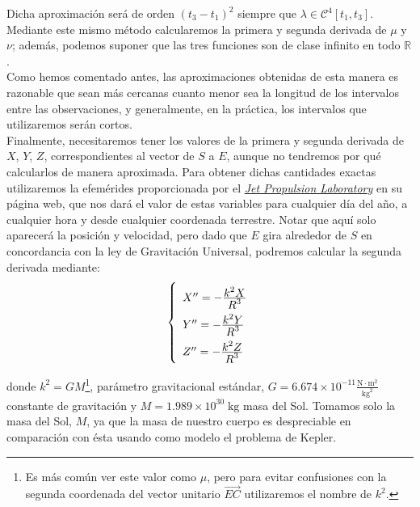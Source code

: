 \documentclass[11pt]{book}
\newcommand\ddfrac[2]{\frac{\displaystyle #1}{\displaystyle #2}}
\begin{document}
Dicha aproximación será de orden $(t_3-t_1)^2$ siempre que $\lambda\in\mathcal{C}^4[t_1,t_3]$. Mediante este mismo método calcularemos la primera y segunda derivada de $\mu$ y $\nu$; además, podemos suponer que las tres funciones son de clase infinito en todo $\mathbb{R}$.\\

Como hemos comentado antes, las aproximaciones obtenidas de esta manera es razonable que sean más cercanas cuanto menor sea la longitud de los intervalos entre las observaciones, y generalmente, en la práctica, los intervalos que utilizaremos serán cortos.\\

Finalmente, necesitaremos tener los valores de la primera y segunda derivada de $X$, $Y$, $Z$, correspondientes al vector de $S$ a $E$, aunque no tendremos por qué calcularlos de manera aproximada. Para obtener dichas cantidades exactas utilizaremos la efemérides proporcionada por el \href{https://ssd.jpl.nasa.gov/horizons.cgi}{\textit{Jet Propulsion Laboratory}} en su página web, que nos dará el valor de estas variables para cualquier día del año, a cualquier hora y desde cualquier coordenada terrestre. Notar que aquí solo aparecerá la posición y velocidad, pero dado que $E$ gira alrededor de $S$ en concordancia con la ley de Gravitación Universal, podremos calcular la segunda derivada mediante:
\begin{align}
\left\{
\def\arraystretch{2}
\begin{array}{l}
	X'' = -\ddfrac{k^2X}{R^3}\\
	Y'' = -\ddfrac{k^2Y}{R^3}\\
	Z'' = -\ddfrac{k^2Z}{R^3}
\end{array}
\right.
\label{eq:ley_gravitacion_S_E}
\end{align}

\noindent donde $k^2=GM$\footnote{Es más común ver este valor como $\mu$, pero para evitar confusiones con la segunda coordenada del vector unitario $\overrightarrow{EC}$ utilizaremos el nombre de $k^2$.}, parámetro gravitacional estándar, $G=6.674\times10^{-11}\frac{\text{N}\cdot\text{m}^2}{\text{kg}^2}$ constante de gravitación y $M=1.989\times10^{30}\;\text{kg}$ masa del Sol. Tomamos solo la masa del Sol, $M$, ya que la masa de nuestro cuerpo es despreciable en comparación con ésta usando como modelo el problema de Kepler.\\
\end{document}
